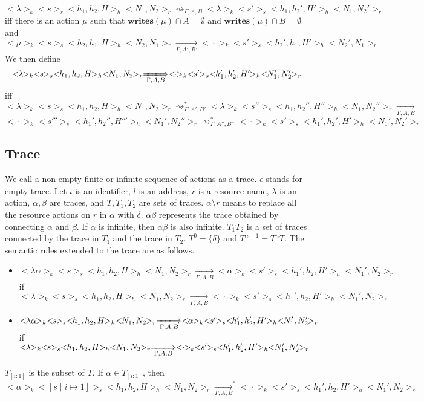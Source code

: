 \documentclass{lmcs} %
\theoremstyle{plain}\newtheorem{satz}[thm]{Satz} %
\begin{document}
\begin{defi}
$$<\!\!\lambda\!\!>_k<\!\!s\!\!>_s<\!\!h_1,h_2,H\!\!>_h<\!\!N_1,N_2\!\!>_r\rightsquigarrow_{\Gamma, A,B}<\!\!\lambda\!\!>_k<\!\!s'\!\!>_s<\!\!h_1,h_2',H'\!\!>_h<\!\!N_1,N_2'\!\!>_r$$
iff there is an action $\mu$ such that $\mathbf{writes}(\mu)\cap A =\emptyset$ and $\mathbf{writes}(\mu)\cap B =\emptyset$ and
$$<\!\!\mu\!\!>_k<\!\!s\!\!>_s<\!\!h_2,h_1,H\!\!>_h<\!\!N_2,N_1\!\!>_r\xrightarrow[\Gamma, A', B']{}<\!\!\cdot\!\!>_k<\!\!s'\!\!>_s<\!\!h_2',h_1,H'\!\!>_h<\!\!N_2',N_1\!\!>_r$$
We then define
$$<\!\!\lambda\!\!>_k<\!\!s\!\!>_s<\!\!h_1,h_2,H\!\!>_h<\!\!N_1,N_2\!\!>_r\xLongrightarrow[\Gamma, A, B]{}<\!\!\cdot\!\!>_k<\!\!s'\!\!>_s<\!\!h_1',h_2',H'\!\!>_h<\!\!N_1',N_2'\!\!>_r$$
iff
$$<\!\!\lambda\!\!>_k<\!\!s\!\!>_s<\!\!h_1,h_2,H\!\!>_h<\!\!N_1,N_2\!\!>_r\rightsquigarrow_{\Gamma, A' ,B'}^*<\!\!\lambda\!\!>_k<\!\!s''\!\!>_s<\!\!h_1,h_2'',H''\!\!>_h<\!\!N_1,N_2''\!\!>_r\xrightarrow[\Gamma, A, B]{}$$
$$<\!\!\cdot\!\!>_k<\!\!s'''\!\!>_s<\!\!h_1',h_2'',H'''\!\!>_h<\!\!N_1',N_2''\!\!>_r\rightsquigarrow_{\Gamma, A'', B''}^*<\!\!\cdot\!\!>_k<\!\!s'\!\!>_s<\!\!h_1',h_2',H'\!\!>_h<\!\!N_1',N_2'\!\!>_r$$
\end{defi}
\subsection*{Trace}
We call a non-empty finite or infinite sequence of actions as a trace. $\epsilon$ stands for empty trace. Let $i$ is an identifier, $l$ is an address, $r$ is a resource name, $\lambda$ is an action, $\alpha, \beta$ are traces, and $T, T_1, T_2$ are sets of traces. $\alpha\setminus r$ means to replace all the resource actions on $r$ in $\alpha$ with $\delta$. $\alpha\beta$ represents the trace obtained by connecting $\alpha$ and $\beta$. If $\alpha$ is infinite, then $\alpha\beta$ is also infinite. $T_1T_2$ is a set of traces connected by the trace in $T_1$ and the trace in $T_2$. $T^0=\{\delta\}$ and $T^{n+1}=T^nT$. The semantic rules extended to the trace are as follows.
\begin{itemize}
  \item $<\!\!\lambda \alpha\!\!>_k<\!\!s\!\!>_s<\!\!h_1,h_2,H\!\!>_h<\!\!N_1,N_2\!\!>_r\xrightarrow[\Gamma, A,B]{}<\!\!\alpha\!\!>_k<\!\!s'\!\!>_s<\!\!h_1',h_2,H'\!\!>_h<\!\!N_1',N_2\!\!>_r$\\
      if $<\!\!\lambda\!\!>_k<\!\!s\!\!>_s<\!\!h_1,h_2,H\!\!>_h<\!\!N_1,N_2\!\!>_r\xrightarrow[\Gamma, A,B]{}<\!\!\cdot\!\!>_k<\!\!s'\!\!>_s<\!\!h_1',h_2,H'\!\!>_h<\!\!N_1',N_2\!\!>_r$
  \item $<\!\!\lambda \alpha\!\!>_k<\!\!s\!\!>_s<\!\!h_1,h_2,H\!\!>_h<\!\!N_1,N_2\!\!>_r\xLongrightarrow[\Gamma, A, B]{}<\!\!\alpha\!\!>_k<\!\!s'\!\!>_s<\!\!h_1',h_2',H'\!\!>_h<\!\!N_1',N_2'\!\!>_r$\\
      if $<\!\!\lambda\!\!>_k<\!\!s\!\!>_s<\!\!h_1,h_2,H\!\!>_h<\!\!N_1,N_2\!\!>_r\xLongrightarrow[\Gamma, A, B]{}<\!\!\cdot\!\!>_k<\!\!s'\!\!>_s<\!\!h_1',h_2',H'\!\!>_h<\!\!N_1',N_2'\!\!>_r$
\end{itemize}
$T_{[i:1]}$ is the subset of $T$. If $\alpha\in T_{[i:1]}$, then
$$<\!\!\alpha\!\!>_k<\!\![s\mid i\mapsto1]\!\!>_s<\!\!h_1,h_2,H\!\!>_h<\!\!N_1,N_2\!\!>_r\xrightarrow[\Gamma, A,B]{}^*<\!\!\cdot\!\!>_k<\!\!s'\!\!>_s<\!\!h_1',h_2,H'\!\!>_h<\!\!N_1',N_2\!\!>_r$$
\end{document}
